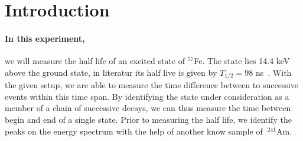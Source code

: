 \section{Introduction}
\paragraph{In this experiment,}
 we will measure the half life of an excited state of 
$^{57}$Fe. The state lies 14.4 keV above the ground state, in literatur its half live is given 
by $T_{1/2} = 98$ ns~\cite{ver}. With the given setup, 
we are able to measure the time difference between to successive events within this 
time span. By identifying the state under consideration as a member of a chain of successive decays, 
we can thus measure the time between begin and end of a single state. 
Prior to measuring the half life, we identify the peaks on the energy spectrum 
with the help of another know sample of $~^{241}$Am. 


